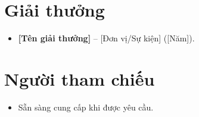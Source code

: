 \documentclass[11pt,a4paper,sans]{moderncv}
\begin{document}
\section{Giải thưởng}
\vspace{1pt}
\begin{itemize}
\item{\textbf{[Tên giải thưởng]} -- [Đơn vị/Sự kiện] ([Năm]).}
\end{itemize}


\section{Người tham chiếu}
\vspace{1pt}
\begin{itemize}
\item{Sẵn sàng cung cấp khi được yêu cầu.}
\end{itemize}
\end{document}
